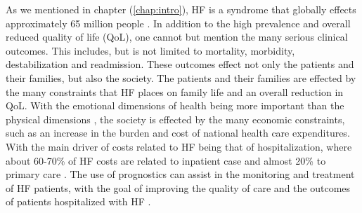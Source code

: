 \documentclass[../thesis.tex]{subfiles}
\begin{document}
\noindent As we mentioned in chapter (\ref{chap:intro}), HF is a syndrome that globally effects approximately 65 million people \citep{hay2017global}. In addition to the high prevalence and overall reduced quality of life (QoL), one cannot but mention the many serious clinical outcomes. This includes, but is not limited to mortality, morbidity, destabilization and readmission. These outcomes effect not only the patients and their families, but also the society. The patients and their families are effected by the many constraints that HF places on family life and an overall reduction in QoL. With the emotional dimensions of health being more important than the physical dimensions \citep{dunderdale2005quality}, the society is effected by the many economic constraints, such as an increase in the burden and cost of national health care expenditures. With the main driver of costs related to HF being that of hospitalization, where about 60-70\% of HF costs are related to inpatient case and almost 20\% to primary care \citep{braunwald2015war}. The use of prognostics can assist in the monitoring and treatment of HF patients, with the goal of improving the quality of care and the outcomes of patients hospitalized with HF 
\citep{tripoliti2017heart}.\\
\end{document}
